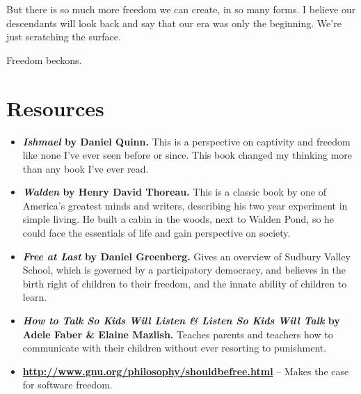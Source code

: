 But there is so much more freedom we can create, in so many forms. I believe our descendants will look back and say that our era was only the beginning. We're just scratching the surface.

Freedom beckons.

\newpage
\section{Resources}
\begin{itemize}
\item \textbf{\emph{Ishmael} by Daniel Quinn.} This is a perspective on captivity and freedom like none I've ever seen before or since. This book changed my thinking more than any book I've ever read.

\item \textbf{\emph{Walden} by Henry David Thoreau.} This is a classic book by one of America's greatest minds and writers, describing his two year experiment in simple living. He built a cabin in the woods, next to Walden Pond, so he could face the essentials of life and gain perspective on society.

\item \textbf{\emph{Free at Last} by Daniel Greenberg.} Gives an overview of Sudbury Valley School, which is governed by a participatory democracy, and believes in the birth right of children to their freedom, and the innate ability of children to learn.
	
\item \textbf{\emph{How to Talk So Kids Will Listen \& Listen So Kids Will Talk} by Adele Faber \& Elaine Mazlish.} Teaches parents and teachers how to communicate with their children without ever resorting to punishment.

\item \textbf{\url{http://www.gnu.org/philosophy/shouldbefree.html}} -- Makes the case for software freedom.
\end{itemize}

